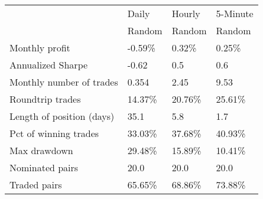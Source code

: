 \begin{tabular}{llll}
\toprule
{} &    Daily &   Hourly & 5-Minute \\
{} &   Random &   Random &   Random \\
\midrule
Monthly profit            &  -0.59\% &   0.32\% &   0.25\% \\
Annualized Sharpe         &    -0.62 &      0.5 &      0.6 \\
Monthly number of trades  &    0.354 &     2.45 &     9.53 \\
Roundtrip trades          &  14.37\% &  20.76\% &  25.61\% \\
Length of position (days) &     35.1 &      5.8 &      1.7 \\
Pct of winning trades     &  33.03\% &  37.68\% &  40.93\% \\
Max drawdown              &  29.48\% &  15.89\% &  10.41\% \\
Nominated pairs           &     20.0 &     20.0 &     20.0 \\
Traded pairs              &  65.65\% &  68.86\% &  73.88\% \\
\bottomrule
\end{tabular}
